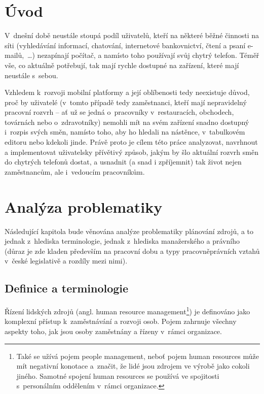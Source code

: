 \documentclass[twoside]{ctuthesis}
\begin{document}
\maketitle
%
\chapter{Úvod}

V~dnešní době neustále stoupá podíl uživatelů, kteří na některé běžné činnosti na síti (vyhledávání informací, chatování, internetové bankovnictví, čtení a psaní e-mailů,~\ldots) nezapínají počítač, a namísto toho používají svůj chytrý telefon. Téměř vše, co aktuálně potřebují, tak mají rychle dostupné na zařízení, které mají neustále s~sebou.

Vzhledem k~rozvoji mobilní platformy a její oblíbenosti tedy neexistuje důvod, proč by uživatelé (v~tomto případě tedy zaměstnanci, kteří mají nepravidelný pracovní rozvrh -- ať už se jedná o~pracovníky v~restauracích, obchodech, továrnách nebo o~zdravotníky) nemohli mít na svém zařízení snadno dostupný i~rozpis svých směn, namísto toho, aby ho hledali na nástěnce, v~tabulkovém editoru nebo kdekoli jinde. Právě proto je cílem této práce analyzovat, navrhnout a im\-ple\-men\-to\-vat uživatelsky přívětivý způsob, jakým by šlo aktuální rozvrh směn do chytrých telefonů dostat, a usnadnit (a snad i zpříjemnit) tak život nejen zaměstnancům, ale i~vedoucím pracovníkům.




\chapter{Analýza problematiky}
Následující kapitola bude věnována analýze problematiky plánování zdrojů, a to jednak z~hlediska terminologie, jednak z~hlediska manažerského a právního (důraz je zde kladen především na pracovní dobu a typy pracovněprávních vztahů v~české legislativě a rozdíly mezi nimi).

\section{Definice a terminologie}

Řízení lidských zdrojů (angl. human resource management\footnote{Také se užívá pojem people management, neboť pojem human resources může mít negativní konotace a~značit, že lidé jsou zdrojem ve výrobě jako cokoli jiného. \cite[s.~1]{armstrong2014} Samotné spojení human resources se používá ve spojitosti s~personálním oddělením v~rámci organizace. }) je definováno jako komplexní přístup k~zaměstnávání a rozvoji osob. Pojem zahrnuje všechny aspekty toho, jak jsou osoby zaměstnány a řízeny v~rámci organizace. \cite[s.~1]{armstrong2014}
\end{document}
